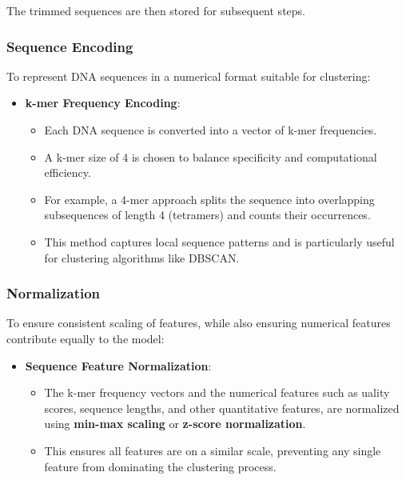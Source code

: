 The trimmed sequences are then stored for subsequent steps.

\subsubsection{Sequence Encoding}
To represent DNA sequences in a numerical format suitable for clustering:
\begin{itemize}
    \item \textbf{k-mer Frequency Encoding}:
    \begin{itemize}
        \item Each DNA sequence is converted into a vector of k-mer frequencies.
        \item A k-mer size of 4 is chosen to balance specificity and computational efficiency.
        \item For example, a 4-mer approach splits the sequence into overlapping subsequences of length 4 (tetramers) and counts their occurrences.
        \item This method captures local sequence patterns and is particularly useful for clustering algorithms like DBSCAN.
    \end{itemize}
\end{itemize}

\subsubsection{Normalization}
To ensure consistent scaling of features, while also ensuring numerical features contribute equally to the model:
\begin{itemize}
    \item \textbf{Sequence Feature Normalization}:
    \begin{itemize}
        \item The k-mer frequency vectors and the numerical features such as uality scores, sequence lengths, and other quantitative features, are normalized using \textbf{min-max scaling} or \textbf{z-score normalization}.
        \item This ensures all features are on a similar scale, preventing any single feature from dominating the clustering process.
    
    \end{itemize}
\end{itemize}

